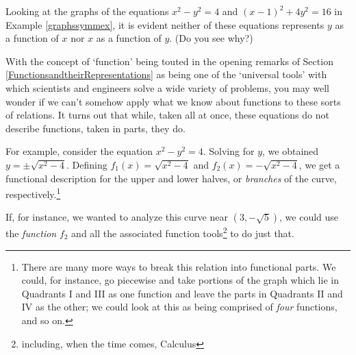 \documentclass{ximera}
\begin{document}
Looking at the graphs of the equations $x^2-y^2 = 4$ and  $(x-1)^2+4y^2 = 16$ in Example \ref{graphssymmex}, it is evident neither of these equations represents $y$ as a function of $x$ nor $x$ as a function of $y$. (Do you see why?)  

\smallskip

With the concept of `function' being touted in the opening remarks of Section \ref{FunctionsandtheirRepresentations} as being one of the `universal tools' with which scientists and engineers solve a wide variety of problems, you may well wonder if we can't somehow apply what we know about functions to these sorts of relations.  It turns out that while, taken all at once, these equations do not describe functions, taken in parts, they do. 

\smallskip

For example, consider the equation $x^2 - y^2 = 4$.  Solving for $y$, we obtained $y = \pm \sqrt{x^2-4}$.  Defining $f_{1}(x) = \sqrt{x^2-4}$ and $f_{2}(x) = -\sqrt{x^2-4}$, we get a functional description for the upper and lower halves, or \textit{branches} of the curve, respectively.\footnote{There are many more ways to break this relation into functional parts.  We could, for instance, go piecewise and take portions of the graph which lie in Quadrants I and III as one function and leave the parts in Quadrants II and IV as the other;  we could look at this as being comprised of \textit{four} functions, and so on.} 

\smallskip

 If, for instance, we wanted to analyze this curve near $(3, -\sqrt{5})$, we could use the \textit{function} $f_{2}$ and all the associated function tools\footnote{including, when the time comes, Calculus} to do just that. 
\end{document}
